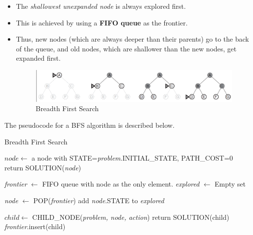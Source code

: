 \documentclass{article}
\theoremstyle{plain}
\theoremstyle{definition}
\begin{document}
\begin{itemize}
    \item The \textit{shallowest unexpanded node} is always explored first. 
    
    \item This is achieved by using a \textbf{FIFO queue} as the frontier. 
    
    \item Thus, new nodes (which are always deeper than their parents) go to the back of the queue, and old nodes, which are shallower than the new nodes, get expanded first.
    
    \begin{figure}[ht]
        \centering
        \includegraphics[scale=0.65]{ml5.png}
        \caption{Breadth First Search}
        \label{fig:my_label_5}
    \end{figure}
\end{itemize}
The pseudocode for a BFS algorithm is described below. 
\begin{algorithm}
    \caption{Breadth First Search}
    \begin{algorithmic}
            \State $ node \gets $ a node with STATE=\textit{problem}.INITIAL\_STATE, PATH\_COST=0
                \State return SOLUTION(\textit{node})
            \EndIf
            
            \State \textit{frontier} $\gets$ FIFO queue with node as the only element.
            \State \textit{explored} $\gets$ Empty set
            
                \State \textit{node} $\gets$ POP(\textit{frontier})
                \State add \textit{node}.STATE to \textit{explored}

                    \State $ child \gets$ CHILD\_NODE(\textit{problem, node, action})
                            \State return SOLUTION(child)
                            \
                        \EndIf
                        \State \textit{frontier}.insert(child)
                    \EndIf
                \EndFor
            \EndWhile
        \EndProcedure
    \end{algorithmic}
\end{algorithm}
\end{document}
